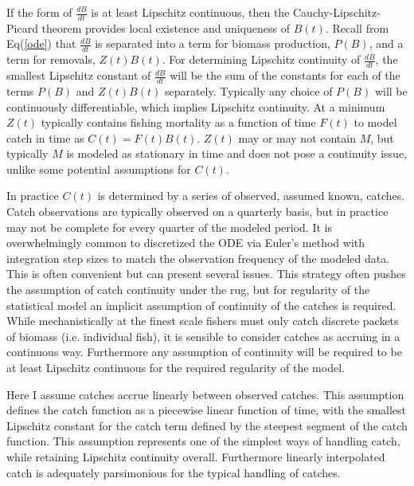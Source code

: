 \documentclass[12pt]{article}
\begin{document}
%
If the form of $\frac{dB}{dt}$ is at least Lipschitz continuous, then the
Cauchy-Lipschitz-Picard theorem provides local existence and uniqueness of
$B(t)$. %
Recall from Eq(\ref{ode}) that $\frac{dB}{dt}$ is separated into
a term for biomass production, $P(B)$, and a term for removals, $Z(t)B(t)$. 
For determining Lipschitz continuity of $\frac{dB}{dt}$,
the smallest Lipschitz constant of $\frac{dB}{dt}$ will be the sum of the
constants for each of the terms $P(B)$ and $Z(t)B(t)$ separately. Typically any 
choice of $P(B)$ will be continuously differentiable, which implies Lipschitz 
continuity. %
At a minimum $Z(t)$ typically contains fishing mortality as a function of time $F(t)$ to model catch in time as $C(t)=F(t)B(t)$.
$Z(t)$ may or may not contain $M$, but typically $M$ is modeled as stationary in 
time and does not pose a continuity issue, unlike some potential assumptions for $C(t)$. 

%
In practice $C(t)$ is determined by a series of observed, assumed known, catches. 
Catch observations are typically observed on a quarterly basis, but
in practice may not be complete for every quarter of the modeled period. It is
overwhelmingly common to discretized the ODE via Euler's method with integration
step sizes to match the observation frequency of the modeled data. This is often
convenient but can present several issues. This strategy often pushes the
assumption of catch continuity under the rug, but for regularity of the %
statistical model an implicit assumption of continuity of the catches is
required. While mechanistically at the finest scale fishers must only catch
discrete packets of biomass (i.e. individual fish), it is sensible to consider
catches as accruing in a continuous way. %
Furthermore any assumption of continuity will be required to be at least
Lipschitz continuous for the required regularity of the model.

%
Here I assume catches accrue linearly between observed catches. This assumption
defines the catch function as a piecewise linear function of time, with the
smallest Lipschitz constant for the catch term defined by the steepest segment
of the catch function. This assumption represents one of the simplest ways of
handling catch, while retaining Lipschitz continuity overall. Furthermore linearly
interpolated catch is adequately parsimonious for the typical handling of catches.
\end{document}
